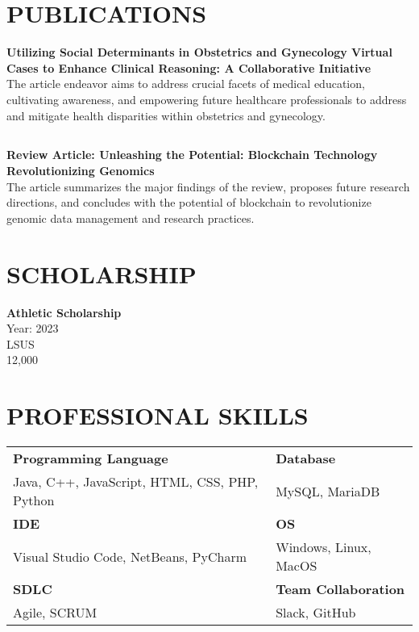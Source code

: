 \documentclass[a4paper,9pt]{article}
\begin{document}
\section*{PUBLICATIONS}

\textbf{Utilizing Social Determinants in Obstetrics and Gynecology Virtual Cases to Enhance Clinical Reasoning: A Collaborative Initiative} \\
The article endeavor aims to address crucial facets of medical education, cultivating awareness, and empowering future healthcare professionals to address and mitigate health disparities within obstetrics and gynecology.

\subsection*{} 
\textbf{Review Article: Unleashing the Potential: Blockchain Technology Revolutionizing Genomics} \\
The article summarizes the major findings of the review, proposes future research directions, and concludes with the potential of blockchain to revolutionize genomic data management and research practices.


\section*{SCHOLARSHIP}

\noindent
\textbf{Athletic Scholarship} \\
Year: 2023 \\
LSUS \\
12,000

\section*{PROFESSIONAL SKILLS}

\noindent
\begin{tabular}{|p{}|p{}|}
\hline
\textbf{Programming Language} & \textbf{Database} \\
Java, C++, JavaScript, HTML, CSS, PHP, Python & MySQL, MariaDB \\
\hline
\textbf{IDE} & \textbf{OS} \\
Visual Studio Code, NetBeans, PyCharm & Windows, Linux, MacOS \\
\hline
\textbf{SDLC} & \textbf{Team Collaboration} \\
Agile, SCRUM & Slack, GitHub \\
\hline
\end{tabular}
\end{document}
